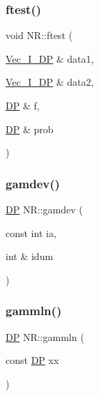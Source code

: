 \subsubsection{\texorpdfstring{ftest()}{ftest()}}
{\footnotesize\ttfamily void N\+R\+::ftest (\begin{DoxyParamCaption}\item[{\mbox{\hyperlink{namespaceNR_a9f943da53862537c552e2a770cb170ae}{Vec\+\_\+\+I\+\_\+\+DP}} \&}]{data1,  }\item[{\mbox{\hyperlink{namespaceNR_a9f943da53862537c552e2a770cb170ae}{Vec\+\_\+\+I\+\_\+\+DP}} \&}]{data2,  }\item[{\mbox{\hyperlink{namespaceNR_af6ff762dd605ff477b8e52387253a02a}{DP}} \&}]{f,  }\item[{\mbox{\hyperlink{namespaceNR_af6ff762dd605ff477b8e52387253a02a}{DP}} \&}]{prob }\end{DoxyParamCaption})}

\mbox{\label{namespaceNR_af895f3a51bb42c0b1498571d5a93c807}} 
\subsubsection{\texorpdfstring{gamdev()}{gamdev()}}
{\footnotesize\ttfamily \mbox{\hyperlink{namespaceNR_af6ff762dd605ff477b8e52387253a02a}{DP}} N\+R\+::gamdev (\begin{DoxyParamCaption}\item[{const int}]{ia,  }\item[{int \&}]{idum }\end{DoxyParamCaption})}

\mbox{\label{namespaceNR_aedefa334aaa11250391e7bb4867dc7d5}} 
\subsubsection{\texorpdfstring{gammln()}{gammln()}}
{\footnotesize\ttfamily \mbox{\hyperlink{namespaceNR_af6ff762dd605ff477b8e52387253a02a}{DP}} N\+R\+::gammln (\begin{DoxyParamCaption}\item[{const \mbox{\hyperlink{namespaceNR_af6ff762dd605ff477b8e52387253a02a}{DP}}}]{xx }\end{DoxyParamCaption})}

